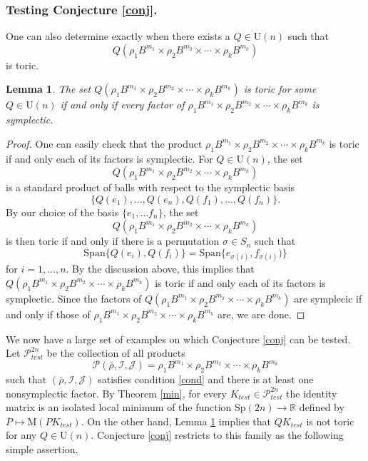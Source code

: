 \documentclass[12pt]{amsart}
\newtheorem{lemma}[theorem]{Lemma}
\theoremstyle{definition}
\newcommand{\RR}{{\mathbb R}}
\newcommand{\mw}{{{\mathrm {M}}}}
\begin{document}
\subsubsection{Testing Conjecture \ref{conj}.} One can also determine exactly when there exists a $Q \in \mathrm{U}(n)$ such that $$Q(\rho_1B^{m_1} \times \rho_2 B^{m_2} \times \cdots \times \rho_k B^{m_k})$$ is toric.



\begin{lemma}\label{non}
The set $Q(\rho_1B^{m_1} \times \rho_2 B^{m_2} \times \cdots \times \rho_k B^{m_k})$ is toric for some $Q \in \mathrm{U}(n)$ if and only if every factor of $\rho_1B^{m_1} \times \rho_2 B^{m_2} \times \cdots \times \rho_k B^{m_k}$ is symplectic.
\end{lemma}

\begin{proof}
One can easily check that the product $\rho_1B^{m_1} \times \rho_2 B^{m_2} \times \cdots \times \rho_k B^{m_k}$ is toric if and only each of its factors is symplectic.  For  $Q \in \mathrm{U}(n)$, the set $$Q(\rho_1B^{m_1} \times \rho_2 B^{m_2} \times \cdots \times \rho_k B^{m_k})$$
is a standard product of balls with respect to the symplectic basis $$\{Q(e_1), \dots, Q(e_n), Q(f_1), \dots, Q(f_n)\}.$$ By our choice of the basis $\{e_1, \dots f_n\}$, the set $$Q(\rho_1B^{m_1} \times \rho_2 B^{m_2} \times \cdots \times \rho_k B^{m_k})$$ is then toric if and only if there is a permutation $\sigma \in S_n$ such that $$\mathrm{Span}\{Q(e_i), Q(f_i)\} = \mathrm{Span}\{e_{\sigma(i)}, f_{\sigma(i)})\}$$ for $i=1, \dots,n$. By the discussion above, this implies that $Q(\rho_1B^{m_1} \times \rho_2 B^{m_2} \times \cdots \times \rho_k B^{m_k})$
is toric if and only each of its factors is symplectic. Since the factors of $Q(\rho_1B^{m_1} \times \rho_2 B^{m_2} \times \cdots \times \rho_k B^{m_k})$ are symplecic if and only if those of $\rho_1B^{m_1} \times \rho_2 B^{m_2} \times \cdots \times \rho_k B^{m_k}$ are, we are done.
\end{proof}


We now have a large set of examples on which Conjecture \ref{conj} can be tested. Let $\mathcal{P}^{2n}_{test}$ be the collection of all products $$\mathcal{P}(\bar{\rho},\mathcal{I},\mathcal{J}) = \rho_1B^{m_1} \times \rho_2 B^{m_2} \times \cdots \times \rho_k B^{m_k}$$
such that $(\bar{\rho},\mathcal{I},\mathcal{J})$   satisfies condition \eqref{cond} and there is at least one  nonsymplectic factor. By Theorem \ref{min}, for every $K_{test} \in  \mathcal{P}^{2n}_{test}$  the identity matrix is an isolated  local minimum of the function  $\mathrm{Sp}(2n) \to \RR$ defined by
$
 P \mapsto \mw(P K_{test}).$
On the other hand, Lemma \ref{non} implies that  $QK_{test}$ is not toric for any $Q \in \mathrm{U}(n)$. Conjecture \ref{conj} restricts to this family as the following simple assertion.
\end{document}

